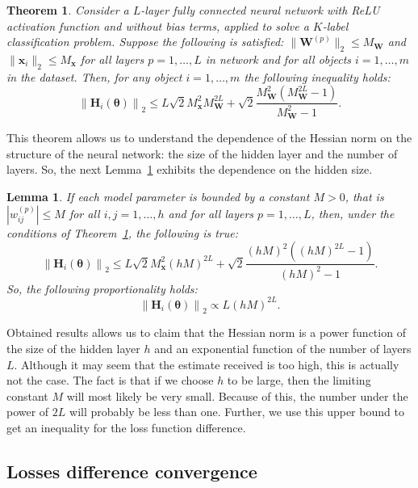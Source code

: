 \documentclass{article}
\newtheorem{theorem}{Theorem} %
\newtheorem{lemma}{Lemma}%
\begin{document}
\begin{theorem}\label{thm:hess}
    Consider a $L$-layer fully connected neural network with ReLU activation function and without bias terms, applied to solve a $K$-label classification problem. Suppose the following is satisfied: $\| \mathbf{W}^{(p)} \|_2 \leqslant M_{\mathbf{W}}$ and $\| \mathbf{x}_i \|_2 \leqslant M_{\mathbf{x}}$ for all layers $p = 1, \ldots, L$ in network and for all objects $i = 1, \ldots, m$ in the dataset. Then, for any object $i = 1, \ldots, m$ the following inequality holds:
    \[ \left\| \mathbf{H}_i(\boldsymbol{\theta}) \right\|_2 \leqslant L \sqrt{2} M_{\mathbf{x}}^2 M_{\mathbf{W}}^{2L} + \sqrt{2} \dfrac{M_{\mathbf{W}}^2 (M_{\mathbf{W}}^{2L} - 1)}{M_{\mathbf{W}}^2 - 1}. \]
\end{theorem}

This theorem allows us to understand the dependence of the Hessian norm on the structure of the neural network: the size of the hidden layer and the number of layers. So, the next Lemma~\ref{lemma:hess} exhibits the dependence on the hidden size.

\begin{lemma}\label{lemma:hess}
    If each model parameter is bounded by a constant $M > 0$, that is $|w_{ij}^{(p)}| \leqslant M$ for all $i, j = 1, \ldots, h$ and for all layers $p = 1, \ldots, L$, then, under the conditions of Theorem~\ref{thm:hess}, the following is true:
    \[ \left\| \mathbf{H}_i(\boldsymbol{\theta}) \right\|_2 \leqslant L \sqrt{2} M_{\mathbf{x}}^2 (hM)^{2L} + \sqrt{2} \dfrac{(hM)^2 ((hM)^{2L} - 1)}{(hM)^2 - 1}. \]
    So, the following proportionality holds:
    \[ \left\| \mathbf{H}_i(\boldsymbol{\theta}) \right\|_2 \propto L (hM)^{2L}. \]
\end{lemma}

Obtained results allows us to claim that the Hessian norm is a power function of the size of the hidden layer $h$ and an exponential function of the number of layers $L$. Although it may seem that the estimate received is too high, this is actually not the case. The fact is that if we choose $h$ to be large, then the limiting constant $M$ will most likely be very small. Because of this, the number under the power of $2L$ will probably be less than one. Further, we use this upper bound to get an inequality for the loss function difference.

\subsection{Losses difference convergence}\label{subseq:rate}
\end{document}
